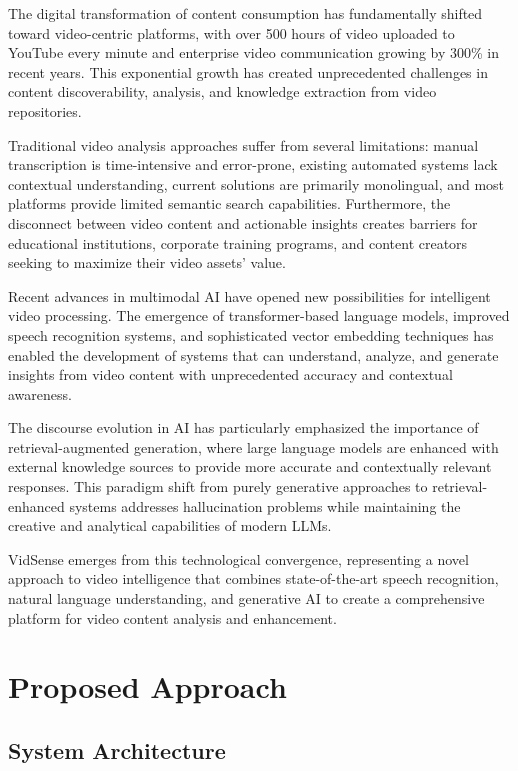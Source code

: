 \documentclass{bscs}
\begin{document}
The digital transformation of content consumption has fundamentally shifted toward video-centric platforms, with over 500 hours of video uploaded to YouTube every minute and enterprise video communication growing by 300\% in recent years. This exponential growth has created unprecedented challenges in content discoverability, analysis, and knowledge extraction from video repositories.

Traditional video analysis approaches suffer from several limitations: manual transcription is time-intensive and error-prone, existing automated systems lack contextual understanding, current solutions are primarily monolingual, and most platforms provide limited semantic search capabilities. Furthermore, the disconnect between video content and actionable insights creates barriers for educational institutions, corporate training programs, and content creators seeking to maximize their video assets' value.

Recent advances in multimodal AI have opened new possibilities for intelligent video processing. The emergence of transformer-based language models, improved speech recognition systems, and sophisticated vector embedding techniques has enabled the development of systems that can understand, analyze, and generate insights from video content with unprecedented accuracy and contextual awareness.

The discourse evolution in AI has particularly emphasized the importance of retrieval-augmented generation, where large language models are enhanced with external knowledge sources to provide more accurate and contextually relevant responses. This paradigm shift from purely generative approaches to retrieval-enhanced systems addresses hallucination problems while maintaining the creative and analytical capabilities of modern LLMs.

VidSense emerges from this technological convergence, representing a novel approach to video intelligence that combines state-of-the-art speech recognition, natural language understanding, and generative AI to create a comprehensive platform for video content analysis and enhancement.

\chapter{Proposed Approach}

\section{System Architecture}
\end{document}
